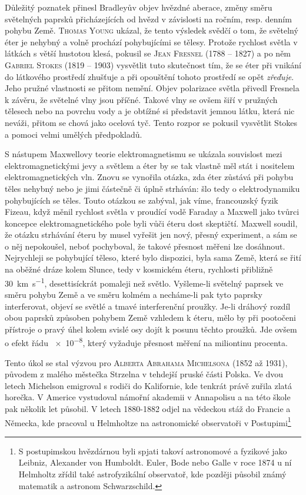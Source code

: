       Důležitý poznatek přinesl Bradleyův objev hvězdné aberace, změny směru světelných paprsků
      přicházejících od hvězd v závislosti na ročním, resp. denním pohybu Země. \textsc{Thomas
      Young} ukázal, že tento výsledek svědčí o tom, že světelný éter je nehybný a volně prochází
      pohybujícími se tělesy. Protože rychlost světla v látkách s větší hustotou klesá, pokusil se
      \textsc{Jean Fresnel} (1788 – 1827) a po něm \textsc{Gabriel Stokes} (1819 – 1903) vysvětlit
      tuto skutečnost tím, že se éter při vnikání do látkového prostředí zhušťuje a při opouštění
      tohoto prostředí se opět \emph{zřeďuje}. Jeho pružné vlastnosti se přitom nemění. Objev
      polarizace světla přivedl Fresnela k závěru, že světelné vlny jsou příčné. Takové vlny se
      ovšem šiří v pružných tělesech nebo na povrchu vody a je obtížné si představit jemnou látku,
      která nic neváži, přitom se chová jako ocelová tyč. Tento rozpor se pokusil vysvětlit Stokes a
      pomoci velmi umělých předpokladů.

      S nástupem Maxwellovy teorie elektromagnetismu se ukázala souvislost mezi elektromagnetickými
      jevy a světlem a éter by se tak vlastně měl stát i nositelem elektromagnetických vln. Znovu se
      vynořila otázka, zda éter zůstává při pohybu těles nehybný nebo je jimi částečně či úplně
      strháván: šlo tedy o elektrodynamiku pohybujících se těles. Touto otázkou se zabýval, jak
      víme, francouzský fyzik Fizeau, když měnil rychlost světla v proudící vodě Faraday a Maxwell
      jako tvůrci koncepce elektromagnetického pole byli vůči éteru dost skeptičtí. Maxwell soudil,
      že otázku strhávání éteru by musel vyřešit jen nový, přesný experiment, a sám se o něj
      nepokoušel, neboť pochyboval, že takové přesnost měřeni lze dosáhnout. Nejrychleji se
      pohybující těleso, které bylo dispozici, byla sama Země, která se řití na oběžné dráze kolem
      Slunce, tedy v kosmickém éteru, rychlosti přibližně \SI{30}{\km\per\s}, desettisíckrát
      pomaleji než světlo. Vyšleme-li světelný paprsek ve směru pohybu Země a ve směru kolmém a
      necháme-li pak tyto paprsky interferovat, objeví se světlé a tmavé interferenční proužky.
      Je-li dráhový rozdíl obou paprsků způsoben pohybem Země vzhledem k éteru, mělo by při
      pootočeni přístroje o pravý úhel kolem svislé osy dojít k posunu těchto proužků. Jde ovšem o
      efekt řádu \num{e-8}, který vyžaduje přesnost měření na miliontinu procenta. 

      Tento úkol se stal výzvou pro \textsc{Alberta Abrahama Michelsona} (1852 až 1931), původem z
      malého městečka Strzelna v tehdejší pruské části Polska. Ve dvou letech Michelson emigroval s
      rodiči do Kalifornie, kde tenkrát právě zuřila zlatá horečka. V Americe vystudoval námořní
      akademii v Annapolisu a na této škole pak několik let působil. V letech 1880-1882 odjel na
      vědeckou stáž do Francie a Německa, kde pracoval u Helmholtze na astronomické observatoři v
      Postupimi\footnote{ S postupimskou hvězdárnou byli spjati takoví astronomové a fyzikové jako
      Leibniz, Alexander von Humboldt. Euler, Bode nebo Galle v roce 1874 u ní Helmholtz zřídil také
      astrofyzikální observatoř, kde později působil známý matematik a astronom Schwarzschild.}
        
